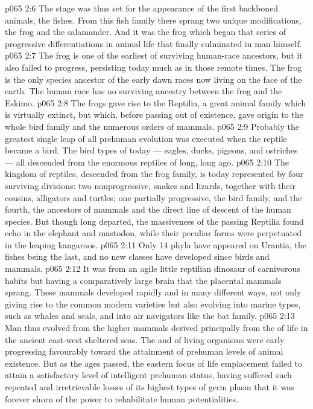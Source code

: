 \vs p065 2:6 \pc The stage was thus set for the appearance of the first backboned animals, the fishes. From this fish family there sprang two unique modifications, the frog and the salamander. And it was the frog which began that series of progressive differentiations in animal life that finally culminated in man himself.
\vs p065 2:7 The frog is one of the earliest of surviving human\hyp{}race ancestors, but it also failed to progress, persisting today much as in those remote times. The frog is the only species ancestor of the early dawn races now living on the face of the earth. The human race has no surviving ancestry between the frog and the Eskimo.
\vs p065 2:8 \pc The frogs gave rise to the Reptilia, a great animal family which is virtually extinct, but which, before passing out of existence, gave origin to the whole bird family and the numerous orders of mammals.
\vs p065 2:9 Probably the greatest single leap of all prehuman evolution was executed when the reptile became a bird. The bird types of today --- eagles, ducks, pigeons, and ostriches --- all descended from the enormous reptiles of long, long ago.
\vs p065 2:10 The kingdom of reptiles, descended from the frog family, is today represented by four surviving divisions: two nonprogressive, snakes and lizards, together with their cousins, alligators and turtles; one partially progressive, the bird family, and the fourth, the ancestors of mammals and the direct line of descent of the human species. But though long departed, the massiveness of the passing Reptilia found echo in the elephant and mastodon, while their peculiar forms were perpetuated in the leaping kangaroos.
\vs p065 2:11 \pc Only 14 phyla have appeared on Urantia, the fishes being the last, and no new classes have developed since birds and mammals.
\vs p065 2:12 \pc It was from an agile little reptilian dinosaur of carnivorous habits but having a comparatively large brain that the placental mammals  sprang. These mammals developed rapidly and in many different ways, not only giving rise to the common modern varieties but also evolving into marine types, such as whales and seals, and into air navigators like the bat family.
\vs p065 2:13 Man thus evolved from the higher mammals derived principally from the  of life in the ancient east\hyp{}west sheltered seas. The  and  of living organisms were early progressing favourably toward the attainment of prehuman levels of animal existence. But as the ages passed, the eastern focus of life emplacement failed to attain a satisfactory level of intelligent prehuman status, having suffered such repeated and irretrievable losses of its highest types of germ plasm that it was forever shorn of the power to rehabilitate human potentialities.
